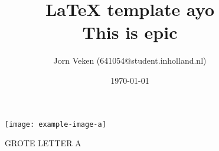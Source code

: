 \documentclass{article}
\title{\LARGE{LaTeX template ayo}\\\normalsize{This is epic}}
\author{Jorn Veken (641054@student.inholland.nl)}
\date{\today}
\begin{document}
    \maketitle
    \vspace{8em}
    \begin{figure}[H]
        \centering
        \texttt{[image: example-image-a]}
        \caption[lettertje]{GROTE LETTER A}
    \end{figure}
    \vfill
    \newpage

    \tableofcontents
    \newpage

    

    \begin{flushleft}
    \begin{multicols}{2}
    
    
    
    \end{multicols}
    \end{flushleft}
    
    \newpage
    \printbibliography

    \iffalse
    \section{geheime bedreiging}
    Oja, nog even wat.
    
    \vspace{1em}
    Als ik iemand ook maar 1 keer enter zie gebruiken, in plaats van gewoon in een lange regel door schrijven. Dan wordt ik big sad, wen er aan. Zet word wrap aan. Idc. Wordt een goede latex gebruiker, enter heeft ook een functie namelijk.
    \fi
\end{document}
